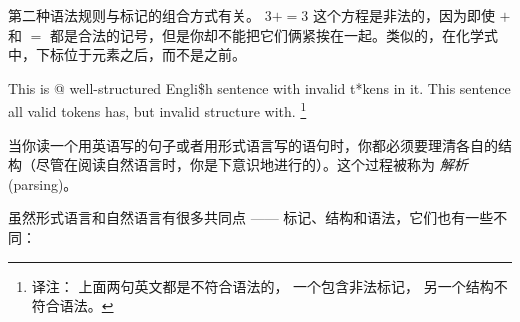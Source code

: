 
第二种语法规则与标记的组合方式有关。 $3 + = 3$ 这个方程是非法的，因为即使 $+$ 和 $=$ 都是合法的记号，但是你却不能把它们俩紧挨在一起。类似的，在化学式中，下标位于元素之后，而不是之前。

This is @ well-structured Engli\$h
sentence with invalid t*kens in it.  This sentence all valid tokens
has, but invalid structure with.
\footnote{译注： 上面两句英文都是不符合语法的， 一个包含非法标记， 另一个结构不符合语法。}


当你读一个用英语写的句子或者用形式语言写的语句时，你都必须要理清各自的结构（尽管在阅读自然语言时，你是下意识地进行的）。这个过程被称为 {\em 解析} (parsing)。
  


虽然形式语言和自然语言有很多共同点 —— 标记、结构和语法，它们也有一些不同：
    


